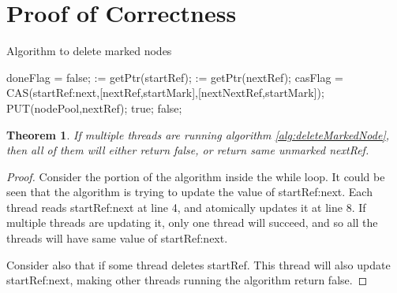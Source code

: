 \documentclass[11pt,onecolumn,draftcls]{IEEEtran}
\newtheorem {theorem}{Theorem}
\begin{document}
\section{Proof of Correctness}
{\fontsize{20}{20}
\begin{algorithm}
  \caption{Algorithm to delete marked nodes}
  \label{alg:deleteMarkedNode}
  \begin{algorithmic}[1]
      \State doneFlag = false;
         := getPtr(startRef);
           := getPtr(nextRef);
            \State casFlag = CAS(startRef:next,[nextRef,startMark],[nextNextRef,startMark]);
               \State PUT(nodePool,nextRef);
            \EndIf
          \Else
            \State
            \Return true;
          \EndIf
        \Else{}
          \State
          \Return false;  
        \EndIf
      \EndWhile        
    \EndFunction
  \end{algorithmic}
\end{algorithm}
}

\begin{theorem}
  If multiple threads are running algorithm \ref{alg:deleteMarkedNode}, then all of them will either return false, or return same unmarked nextRef.
\end{theorem}
\begin{proof}
  Consider the portion of the algorithm inside the while loop. It could be seen that the algorithm is trying to update the value of startRef:next. Each thread reads startRef:next at line 4, and atomically updates it at line 8. If multiple threads are updating it, only one thread will succeed, and so all the threads will have same value of startRef:next.

  Consider also that if some thread deletes startRef. This thread will also update startRef:next, making other threads running the algorithm return false.
\end{proof}
\end{document}
